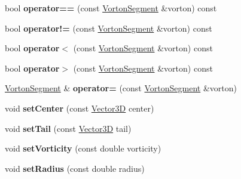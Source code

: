 \begin{DoxyCompactItemize}
\item 
\mbox{\label{class_vorton_segment_aecb70237b927e2a9c4875998ac3150b3}} 
bool {\bfseries operator==} (const \mbox{\hyperlink{class_vorton_segment}{Vorton\+Segment}} \&vorton) const
\item 
\mbox{\label{class_vorton_segment_a66358b75fd40cb71c790bfc19a907c8a}} 
bool {\bfseries operator!=} (const \mbox{\hyperlink{class_vorton_segment}{Vorton\+Segment}} \&vorton) const
\item 
\mbox{\label{class_vorton_segment_abe8fd30f6dac21aca3126a76f8a59f08}} 
bool {\bfseries operator$<$} (const \mbox{\hyperlink{class_vorton_segment}{Vorton\+Segment}} \&vorton) const
\item 
\mbox{\label{class_vorton_segment_a733e8f0df7bbb4e36834702b62f14cb0}} 
bool {\bfseries operator$>$} (const \mbox{\hyperlink{class_vorton_segment}{Vorton\+Segment}} \&vorton) const
\item 
\mbox{\label{class_vorton_segment_ab1af326ce20d27242a1dbfd797357b99}} 
\mbox{\hyperlink{class_vorton_segment}{Vorton\+Segment}} \& {\bfseries operator=} (const \mbox{\hyperlink{class_vorton_segment}{Vorton\+Segment}} \&vorton)
\item 
\mbox{\label{class_vorton_segment_ac2aa8c583ea93d0ad85b0337ecd2b86c}} 
void {\bfseries set\+Center} (const \mbox{\hyperlink{class_vector3_d}{Vector3D}} center)
\item 
\mbox{\label{class_vorton_segment_a563202c84dd6d4f3b07970272aeac993}} 
void {\bfseries set\+Tail} (const \mbox{\hyperlink{class_vector3_d}{Vector3D}} tail)
\item 
\mbox{\label{class_vorton_segment_a5bd107065f1ac6106f77deea5d4679bc}} 
void {\bfseries set\+Vorticity} (const double vorticity)
\item 
\mbox{\label{class_vorton_segment_a3c2c77464cc2422acf251d1a488c88a5}} 
void {\bfseries set\+Radius} (const double radius)
\item 
\mbox{\label{class_vorton_segment_a29e2b74b0000d36d0037dd9f78583349}} 

\end{DoxyCompactItemize}
